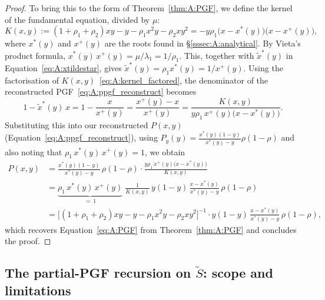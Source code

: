 \begin{proof}
    To bring this to the form of Theorem~\ref{thm:A:PGF}, we define the kernel of the fundamental equation, divided by $\mu$:
    \begin{equation}
        K(x,y) := (1+\rho_1+\rho_2)xy - y - \rho_1 x^2 y - \rho_2 x y^2
                = -y\rho_1\bigl(x-x^*(y)\bigr)\bigl(x-x^{+}(y)\bigr),
        \label{eq:A:kernel_factored}
    \end{equation}
    where $x^*(y)$ and $x^{+}(y)$ are the roots found in \S\ref{sssec:A:analytical}. By Vieta's product formula, $x^*(y)\,x^{+}(y)=\mu/\lambda_1=1/\rho_1$. This, together with $\widetilde{x}^*(y)$ in Equation~\eqref{eq:A:xtildestar}, gives $\widetilde{x}^*(y)=\rho_1 x^*(y)=1/x^{+}(y)$.
    Using the factorisation of $K(x,y)$~\eqref{eq:A:kernel_factored}, the denominator of the reconstructed PGF~\eqref{eq:A:ppgf_reconstruct} becomes
    \begin{equation*}
        1-\widetilde{x}^*(y)\,x = 1 - \frac{x}{x^{+}(y)} = \frac{x^{+}(y)-x}{x^{+}(y)}
        = \frac{K(x,y)}{y\rho_1\,x^{+}(y)\bigl(x-x^*(y)\bigr)}.
    \end{equation*}
    Substituting this into our reconstructed $P(x,y)$ (Equation~\eqref{eq:A:ppgf_reconstruct}), using 
    $P_y(y)=\frac{x^*(y)(1-y)}{x^*(y)-y}\rho(1-\rho)$ and also noting that $\rho_1\,x^*(y)\,x^{+}(y)=1$, we obtain
    \begin{align*}
        P(x,y)
        &= \frac{x^*(y)(1-y)}{x^*(y)-y}\,\rho(1-\rho)
           \cdot \frac{y\rho_1\,x^{+}(y)\bigl(x-x^*(y)\bigr)}{K(x,y)} \\
        &= \underbrace{\rho_1\,x^*(y)\,x^{+}(y)}_{=\,1}\;
           \frac{1}{K(x,y)}\, y(1-y)\,\frac{x-x^*(y)}{x^*(y)-y}\,\rho(1-\rho) \\
        &= \bigl[(1+\rho_1+\rho_2)xy - y - \rho_1 x^2 y - \rho_2 x y^2\bigr]^{-1}
           \cdot y(1-y)\,\frac{x-x^*(y)}{x^*(y)-y}\,\rho(1-\rho),
    \end{align*}
    which recovers Equation~\eqref{eq:A:PGF} from Theorem~\ref{thm:A:PGF} and concludes the proof.
\end{proof}


\subsection{The partial-PGF recursion on \texorpdfstring{$\widetilde{S}$}{S~}: scope and limitations}\label{ssec:A:Stilde}

